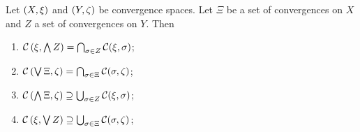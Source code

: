 \begin{proposition} \label{continuityUnderConvergenceLatticeOperations}
Let $\left( X,\xi \right)$ and $\left( Y,\zeta \right)$ be convergence spaces. Let $\Xi$ be a set of convergences on $X$ and $Z$ a set of convergences on $Y$. Then
\begin{enumerate}
\item $\operatorname{\mathcal{C}}\left(\xi, \bigwedge Z\right) = \bigcap_{\sigma\in Z} \operatorname{\mathcal{C}}(\xi, \sigma)$;
\item $\operatorname{\mathcal{C}}\left(\bigvee \Xi, \zeta\right) = \bigcap_{\sigma\in \Xi} \operatorname{\mathcal{C}}(\sigma, \zeta)$;
\item $\operatorname{\mathcal{C}}\left(\bigwedge \Xi, \zeta\right) \supseteq \bigcup_{\sigma\in Z} \operatorname{\mathcal{C}}(\xi, \sigma)$;
\item $\operatorname{\mathcal{C}}\left(\xi, \bigvee Z\right) \supseteq \bigcup_{\sigma\in \Xi} \operatorname{\mathcal{C}}(\sigma, \zeta)$;
\end{enumerate}
\end{proposition}
